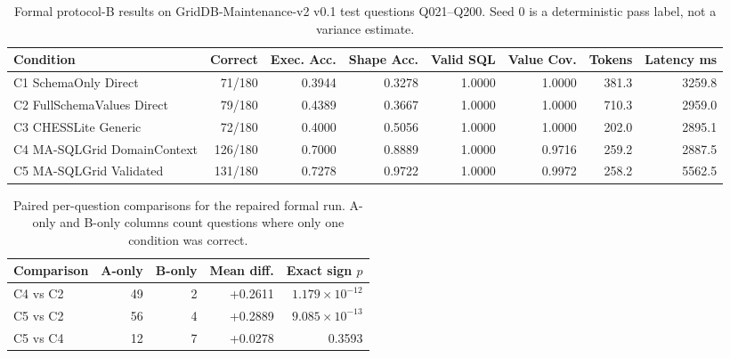 \begin{table}[t]
\centering
\caption{Formal protocol-B results on GridDB-Maintenance-v2 v0.1 test questions Q021--Q200. Seed 0 is a deterministic pass label, not a variance estimate.}
\label{tab:formal-results}
\begin{tabular}{lrrrrrrr}
\hline
Condition & Correct & Exec. Acc. & Shape Acc. & Valid SQL & Value Cov. & Tokens & Latency ms \\
\hline
C1 SchemaOnly Direct & 71/180 & 0.3944 & 0.3278 & 1.0000 & 1.0000 & 381.3 & 3259.8 \\
C2 FullSchemaValues Direct & 79/180 & 0.4389 & 0.3667 & 1.0000 & 1.0000 & 710.3 & 2959.0 \\
C3 CHESSLite Generic & 72/180 & 0.4000 & 0.5056 & 1.0000 & 1.0000 & 202.0 & 2895.1 \\
C4 MA-SQLGrid DomainContext & 126/180 & 0.7000 & 0.8889 & 1.0000 & 0.9716 & 259.2 & 2887.5 \\
C5 MA-SQLGrid Validated & 131/180 & 0.7278 & 0.9722 & 1.0000 & 0.9972 & 258.2 & 5562.5 \\
\hline
\end{tabular}
\end{table}

\begin{table}[t]
\centering
\caption{Paired per-question comparisons for the repaired formal run. A-only and B-only columns count questions where only one condition was correct.}
\label{tab:paired-comparisons}
\begin{tabular}{lrrrr}
\hline
Comparison & A-only & B-only & Mean diff. & Exact sign $p$ \\
\hline
C4 vs C2 & 49 & 2 & +0.2611 & $1.179\times10^{-12}$ \\
C5 vs C2 & 56 & 4 & +0.2889 & $9.085\times10^{-13}$ \\
C5 vs C4 & 12 & 7 & +0.0278 & 0.3593 \\
\hline
\end{tabular}
\end{table}
